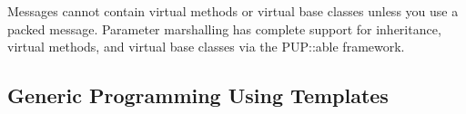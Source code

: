 Messages cannot contain virtual methods
or virtual base classes unless you use a packed message.
Parameter marshalling has complete support for inheritance, virtual
methods, and virtual base classes via the PUP::able framework.




\subsection{Generic Programming Using Templates}



